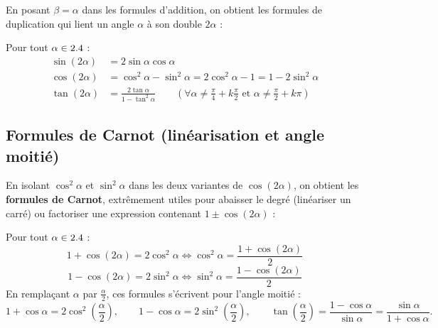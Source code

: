 En posant $\beta = \alpha$ dans les formules d'addition, on obtient les formules de duplication qui lient un angle $\alpha$ à son double $2\alpha$ :

\begin{theoreme}
Pour tout $\alpha \in 2.4$ :
\begin{align}
    \sin(2\alpha) &= 2\sin\alpha\cos\alpha \\
    \cos(2\alpha) &= \cos^2\alpha - \sin^2\alpha = 2\cos^2\alpha - 1 = 1 - 2\sin^2\alpha \\
    \tan(2\alpha) &= \frac{2\tan\alpha}{1 - \tan^2\alpha} \qquad \left(\forall \alpha \neq \frac{\pi}{4} + k\frac{\pi}{2} \text{ et } \alpha \neq \frac{\pi}{2} + k\pi\right)
\end{align}
\end{theoreme}

\subsection{Formules de Carnot (linéarisation et angle moitié)}

En isolant $\cos^2\alpha$ et $\sin^2\alpha$ dans les deux variantes de $\cos(2\alpha)$, on obtient les \textbf{formules de Carnot}, extrêmement utiles pour abaisser le degré (linéariser un carré) ou factoriser une expression contenant $1 \pm \cos(2\alpha)$ :

\begin{theoreme}
Pour tout $\alpha \in 2.4$ :
\begin{equation}
    \boxed{1 + \cos(2\alpha) = 2\cos^2\alpha \iff \cos^2\alpha = \frac{1 + \cos(2\alpha)}{2}}
\end{equation}
\begin{equation}
    \boxed{1 - \cos(2\alpha) = 2\sin^2\alpha \iff \sin^2\alpha = \frac{1 - \cos(2\alpha)}{2}}
\end{equation}
En remplaçant $\alpha$ par $\frac{\alpha}{2}$, ces formules s'écrivent pour l'angle moitié :
\[
    1 + \cos\alpha = 2\cos^2\left(\frac{\alpha}{2}\right), \qquad 1 - \cos\alpha = 2\sin^2\left(\frac{\alpha}{2}\right), \qquad \tan\left(\frac{\alpha}{2}\right) = \frac{1 - \cos\alpha}{\sin\alpha} = \frac{\sin\alpha}{1 + \cos\alpha}.
\]
\end{theoreme}

